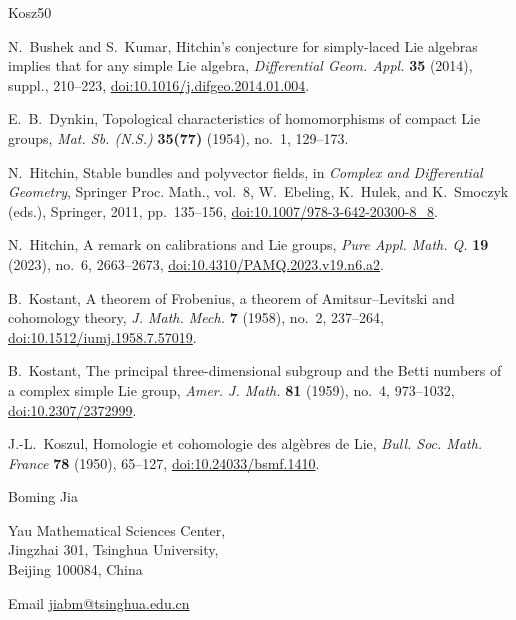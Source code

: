 \documentclass[12pt]{article}
\theoremstyle{definition}
\theoremstyle{remark}
\begin{document}
\begin{thebibliography}{Kosz50}
\setlength{\itemsep}{0.25em}

N.~Bushek and S.~Kumar,
Hitchin's conjecture for simply-laced Lie algebras implies that for any
simple Lie algebra,
\emph{Differential Geom. Appl.} \textbf{35} (2014), suppl.,
210--223,
\href{https://doi.org/10.1016/j.difgeo.2014.01.004}{doi:10.1016/j.difgeo.2014.01.004}.

E.~B.~Dynkin,
Topological characteristics of homomorphisms of compact Lie groups,
\emph{Mat. Sb. (N.S.)} \textbf{35(77)} (1954), no.~1,
129--173.

N.~Hitchin,
Stable bundles and polyvector fields,
in \emph{Complex and Differential Geometry}, Springer Proc. Math.,
vol.~8, W.~Ebeling, K.~Hulek, and K.~Smoczyk (eds.),
Springer, 2011, pp.~135--156,
\href{https://doi.org/10.1007/978-3-642-20300-8_8}{doi:10.1007/978-3-642-20300-8\_8}.

N.~Hitchin,
A remark on calibrations and Lie groups,
\emph{Pure Appl. Math. Q.} \textbf{19} (2023), no.~6,
2663--2673,
\href{https://doi.org/10.4310/PAMQ.2023.v19.n6.a2}{doi:10.4310/PAMQ.2023.v19.n6.a2}.

B.~Kostant,
A theorem of Frobenius, a theorem of Amitsur--Levitski and cohomology theory,
\emph{J. Math. Mech.} \textbf{7} (1958), no.~2,
237--264,
\href{https://doi.org/10.1512/iumj.1958.7.57019}{doi:10.1512/iumj.1958.7.57019}.

B.~Kostant,
The principal three-dimensional subgroup and the Betti numbers of a
complex simple Lie group,
\emph{Amer. J. Math.} \textbf{81} (1959), no.~4,
973--1032,
\href{https://doi.org/10.2307/2372999}{doi:10.2307/2372999}.

J.-L.~Koszul,
Homologie et cohomologie des alg\`ebres de Lie,
\emph{Bull. Soc. Math. France} \textbf{78} (1950),
65--127, \href{https://doi.org/10.24033/bsmf.1410}{doi:10.24033/bsmf.1410}.

\end{thebibliography}

\bigskip
\noindent
Boming Jia

\noindent
Yau Mathematical Sciences Center,\\
Jingzhai 301, Tsinghua University,\\
Beijing 100084, China

\noindent
Email \href{mailto:jiabm@tsinghua.edu.cn}{jiabm@tsinghua.edu.cn}
\end{document}
